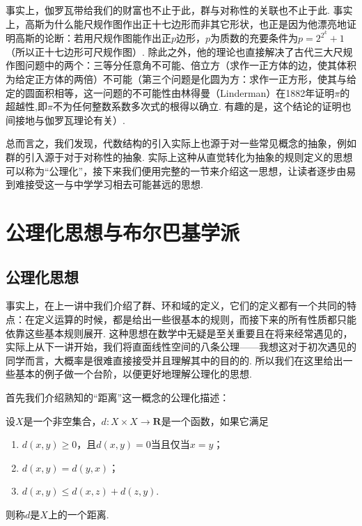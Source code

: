 事实上，伽罗瓦带给我们的财富也不止于此，群与对称性的关联也不止于此. 事实上，高斯为什么能尺规作图作出正十七边形而非其它形状，也正是因为他漂亮地证明高斯的论断：若用尺规作图能作出正$p$边形，$p$为质数的充要条件为$p=2^{2^k}+1$（所以正十七边形可尺规作图）. 除此之外，他的理论也直接解决了古代三大尺规作图问题中的两个：三等分任意角不可能、倍立方（求作一正方体的边，使其体积为给定正方体的两倍）不可能（第三个问题是化圆为方：求作一正方形，使其与给定的圆面积相等，这一问题的不可能性由林得曼（Linderman）在1882年证明$\pi$的超越性,即$\pi$不为任何整数系数多次式的根得以确立. 有趣的是，这个结论的证明也间接地与伽罗瓦理论有关）.

总而言之，我们发现，代数结构的引入实际上也源于对一些常见概念的抽象，例如群的引入源于对于对称性的抽象. 实际上这种从直觉转化为抽象的规则定义的思想可以称为``公理化''，接下来我们便用完整的一节来介绍这一思想，让读者逐步由易到难接受这一与中学学习相去可能甚远的思想.

\section{公理化思想与布尔巴基学派}

\subsection{公理化思想}

事实上，在上一讲中我们介绍了群、环和域的定义，它们的定义都有一个共同的特点：在定义运算的时候，都是给出一些很基本的规则，而接下来的所有性质都只能依靠这些基本规则展开. 这种思想在数学中无疑是至关重要且在将来经常遇见的，实际上从下一讲开始，我们将直面线性空间的八条公理——我想这对于初次遇见的同学而言，大概率是很难直接接受并且理解其中的目的的. 所以我们在这里给出一些基本的例子做一个台阶，以便更好地理解公理化的思想.

首先我们介绍熟知的``距离''这一概念的公理化描述：
\begin{definition}{}{}
    设$X$是一个非空集合，$d\colon X\times X\to \mathbf{R}$是一个函数，如果它满足
    \begin{enumerate}
        \item $d(x,y)\geqslant 0$，且$d(x,y)=0$当且仅当$x=y$；

        \item $d(x,y)=d(y,x)$；

        \item $d(x,y)\leqslant d(x,z)+d(z,y)$.
    \end{enumerate}
    则称$d$是$X$上的一个距离.
\end{definition}

